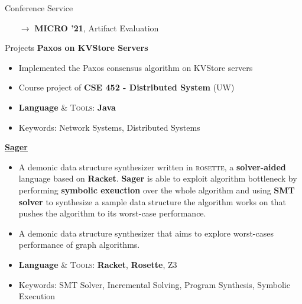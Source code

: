 \documentclass{resume}
\newcommand{\myul}[2][blue]{\setulcolor{#1}\ul{#2}\setulcolor{blue}}
\begin{document}
	\vspace{-5pt}
	\begin{rSection}{Conference Service}
    	\begin{enumerate}
    		\setlength{\itemsep}{1pt}
            \setlength{\parskip}{0pt}
    		\setlength{\parsep}{0pt}
    		\item[$\rightarrow$] \textbf{MICRO '21}, Artifact Evaluation
    	\end{enumerate}
	\end{rSection}
    \begin{rSection}{Projects}
        \textbf{Paxos on KVStore Servers}
        \vspace{-5pt}
        \begin{itemize}
			\setlength{\itemsep}{1pt}
            \setlength{\parskip}{0pt}
			\setlength{\parsep}{0pt}
			\item Implemented the Paxos consensus algorithm on KVStore servers
			\item Course project of \textbf{CSE 452 - Distributed System} (UW)
			\item \textbf{Language} \& \textsc{Tools}: \textbf{Java}
			\item Keywords: Network Systems, Distributed Systems
		\end{itemize}
		\vspace{-5pt}
		\textbf{\href{https://github.com/AD1024/Sager}{\color{blue} \myul{Sager}}} %
		\vspace{-5pt}
		\begin{itemize}
			\setlength{\itemsep}{1pt}
            \setlength{\parskip}{0pt}
			\setlength{\parsep}{0pt}
			\item A demonic data structure synthesizer written in \textsc{rosette}, a \textbf{solver-aided} language based on \textbf{Racket}. \textbf{Sager} is able to exploit algorithm bottleneck by performing \textbf{symbolic exeuction} over the whole algorithm and using \textbf{SMT solver} to synthesize a sample data structure the algorithm works on that pushes the algorithm to its worst-case performance.
			\item A demonic data structure synthesizer that aims to explore worst-cases performance of graph algorithms.
			\item \textbf{Language} \& \textsc{Tools}: \textbf{Racket}, \textbf{Rosette}, \textsc{Z3}
			\item Keywords: SMT Solver, Incremental Solving, Program Synthesis, Symbolic Execution
		\end{itemize}
		\vspace{-5pt}


\end{rSection}
\end{document}
